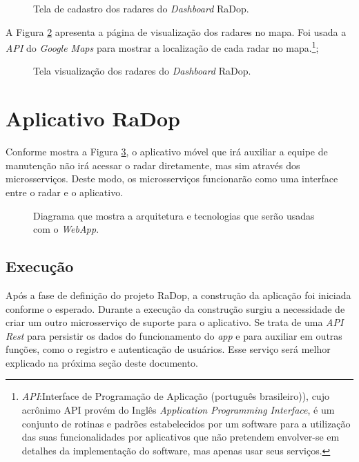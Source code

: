 \begin{figure}[H]
	\caption{\label{fig:radar} Tela de cadastro dos radares do \textit{Dashboard} RaDop.}
\end{figure}

A Figura \ref{fig:mapa} apresenta a página de visualização dos radares no mapa. Foi usada a \textit{API} do \textit{Google Maps} para mostrar a localização de cada radar no mapa.\footnote{\textit{API}:Interface de Programação de Aplicação (português brasileiro)), cujo acrônimo API provém do Inglês \textit{Application Programming Interface}, é um conjunto de rotinas e padrões estabelecidos por um software para a utilização das suas funcionalidades por aplicativos que não pretendem envolver-se em detalhes da implementação do software, mas apenas usar seus serviços.};

\begin{figure}[H]
	\caption{\label{fig:mapa} Tela visualização dos radares do \textit{Dashboard} RaDop.}
\end{figure}

\section{Aplicativo RaDop}

Conforme mostra a Figura \ref{fig:diagrama-arq-webApp}, o aplicativo móvel que irá auxiliar a equipe de manutenção não irá acessar o radar diretamente, mas sim através dos microsserviços. Deste modo, os microsserviços funcionarão como uma interface entre o radar e o aplicativo.

\begin{figure}[H]
	\caption{\label{fig:diagrama-arq-webApp} Diagrama que mostra a arquitetura e tecnologias que serão usadas com o \textit{WebApp}.}
\end{figure}

\subsection{Execução}

Após a fase de definição do projeto RaDop, a construção da aplicação foi iniciada conforme o esperado. Durante a execução da construção surgiu a necessidade de criar um outro microsserviço de suporte para o aplicativo. Se trata de uma \textit{API Rest} para persistir os dados do funcionamento do \textit{app} e para auxiliar em outras funções, como o registro e autenticação de usuários. Esse serviço será melhor explicado na próxima seção deste documento.

